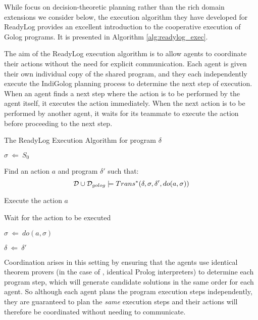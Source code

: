 While \citeauthor{Ferrein2005readylog} focus on decision-theoretic
planning rather than the rich domain extensions we consider below,
the execution algorithm they have developed for ReadyLog provides
an excellent introduction to the cooperative execution of Golog programs.
It is presented in Algorithm \ref{alg:readylog_exec}.

The aim of the ReadyLog execution algorithm is to allow agents to
coordinate their actions without the need for explicit communication.
Each agent is given their own individual copy of the shared program,
and they each independently execute the IndiGolog planning process
to determine the next step of execution. When an agent finds a next
step where the action is to be performed by the agent itself, it executes
the action immediately. When the next action is to be performed by
another agent, it waits for its teammate to execute the action before
proceeding to the next step.

%
\begin{algorithm}[t]
\caption{The ReadyLog Execution Algorithm for program $\delta$}


\label{alg:readylog_exec} \begin{algorithmic}

\STATE $\sigma\ \Leftarrow\ S_{0}$


\STATE Find an action $a$ and program $\delta'$ such that:\[
\mathcal{D}\cup\mathcal{D}_{golog}\models Trans^{*}(\delta,\sigma,\delta',do(a,\sigma))\]



\STATE Execute the action $a$

\ELSE

\STATE Wait for the action to be executed

\ENDIF

\STATE $\sigma\ \Leftarrow\ do(a,\sigma)$

\STATE $\delta\ \Leftarrow\ \delta'$

\ENDWHILE

\end{algorithmic} 
\end{algorithm}


Coordination arises in this setting by ensuring that the agents use
identical theorem provers (in the case of \citep{Ferrein2005readylog},
identical Prolog interpreters) to determine each program step, which
will generate candidate solutions in the same order for each agent.
So although each agent plans the program execution steps independently,
they are guaranteed to plan the \emph{same} execution steps and their
actions will therefore be coordinated without needing to communicate.


